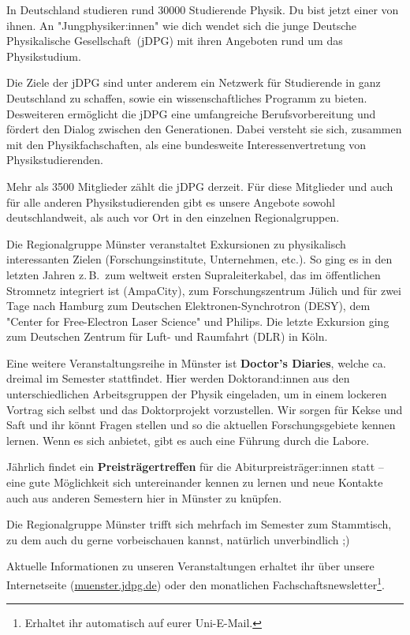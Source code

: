 \begin{multicols}{2}
In Deutschland studieren rund \num{30000} Studierende Physik.
Du bist jetzt einer von ihnen.
An "Jungphysiker:innen" wie dich wendet sich die junge Deutsche Physikalische Gesellschaft~(jDPG) mit ihren Angeboten rund um das Physikstudium.

Die Ziele der jDPG sind unter anderem ein Netzwerk für Studierende in ganz Deutschland zu schaffen, sowie ein wissenschaftliches Programm zu bieten.
Desweiteren ermöglicht die jDPG eine umfangreiche Berufsvorbereitung und fördert den Dialog zwischen den Generationen.
Dabei versteht sie sich, zusammen mit den Physikfachschaften, als eine bundesweite Interessenvertretung von Physikstudierenden.

Mehr als \num{3500} Mitglieder zählt die jDPG derzeit.
Für diese Mitglieder und auch für alle anderen Physikstudierenden gibt es unsere Angebote sowohl deutschlandweit, als auch vor Ort in den einzelnen Regionalgruppen.

Die Regionalgruppe Münster veranstaltet Exkursionen zu physikalisch interessanten Zielen (Forschungsinstitute, Unternehmen, etc.).
So ging es in den letzten Jahren z.\,B.\ zum weltweit ersten Supraleiterkabel, das im öffentlichen Stromnetz integriert ist (AmpaCity), zum Forschungszentrum Jülich und für zwei Tage nach Hamburg zum Deutschen Elektronen-Synchrotron (DESY), dem "Center for Free-Electron Laser Science" und Philips. Die letzte Exkursion ging zum Deutschen Zentrum für Luft- und Raumfahrt (DLR) in Köln.

Eine weitere Veranstaltungsreihe in Münster ist \textbf{Doctor's Diaries}, welche ca. dreimal im Semester stattfindet. Hier werden Doktorand:innen aus den unterschiedlichen Arbeitsgruppen der Physik eingeladen, um in einem lockeren Vortrag sich selbst und das Doktorprojekt vorzustellen. Wir sorgen für Kekse und Saft und ihr könnt Fragen stellen und so die aktuellen Forschungsgebiete kennen lernen. Wenn es sich anbietet, gibt es auch eine Führung durch die Labore. 

Jährlich findet ein \textbf{Preisträgertreffen} für die Abiturpreisträger:innen statt -- eine gute Möglichkeit sich untereinander kennen zu lernen und neue Kontakte auch aus anderen Semestern hier in Münster zu knüpfen.


Die Regionalgruppe Münster trifft sich mehrfach im Semester zum Stammtisch, zu dem auch du gerne vorbeischauen kannst, natürlich unverbindlich ;)


Aktuelle Informationen zu unseren Veranstaltungen erhaltet ihr über unsere Internetseite (\url{muenster.jdpg.de}) oder den monatlichen Fachschaftsnewsletter\footnote{Erhaltet ihr automatisch auf eurer Uni-E-Mail.}.


\end{multicols}
